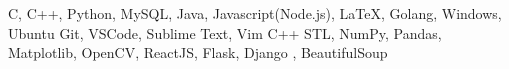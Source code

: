 \documentclass[10pt]{article}
\begin{document}
\vspace{-2.5ex}
\spacedhrule{0.15ex}{1.0ex}
\begingroup
    \fontsize{10pt}{12pt}\selectfont
    \vspace{-0.7ex}
	{C,\hspace{0.75ex} C++,\hspace{0.75ex} Python,\hspace{0.75ex} MySQL,\hspace{0.75ex} Java,\hspace{0.75ex} Javascript(Node.js),\hspace{0.75ex} LaTeX,\hspace{0.75ex} Golang,\hspace{0.75ex} Windows,\hspace{0.75ex} Ubuntu}
	\vspace{-0.7ex}
	{ Git,\hspace{0.75ex} VSCode,\hspace{0.75ex} Sublime Text,\hspace{0.75ex} Vim}
	\vspace{-0.7ex}
    {C++ STL,\hspace{0.75ex} NumPy,\hspace{0.75ex} Pandas,\hspace{0.75ex} Matplotlib,\hspace{0.75ex} OpenCV,\hspace{0.75ex} ReactJS,\hspace{0.75ex} Flask,\hspace{0.75ex} Django ,\hspace{0.75ex}  BeautifulSoup }
   
\endgroup
\end{document}
